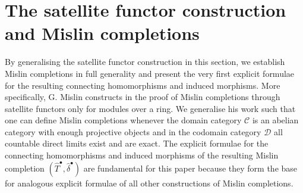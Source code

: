 \documentclass[12pt,a4paper]{article}
\numberwithin{equation}{section}
\theoremstyle{nonumberplain}
\begin{document}
\section{The satellite functor construction and Mislin completions}\label{sec:satellites}

By generalising the satellite functor construction in this section, we establish Mislin completions in full generality and present the very first explicit formulae for the resulting connecting homomorphisms and induced morphisms. More specifically, G.\! Mislin constructs in the proof of \cite[Theorem~2.2]{mis94} Mislin completions through satellite functors only for modules over a ring. We generalise his work such that one can define Mislin completions whenever the domain category $\mathcal{C}$ is an abelian category with enough projective objects and in the codomain category $\mathcal{D}$ all countable direct limits exist and are exact. The explicit formulae for the connecting homomorphisms and induced morphisms of the resulting Mislin completion $(\widehat{T}^{\bullet}, \widehat{\delta}^{\bullet})$ are fundamental for this paper because they form the base for analogous explicit formulae of all other constructions of Mislin completions. \\
\end{document}
